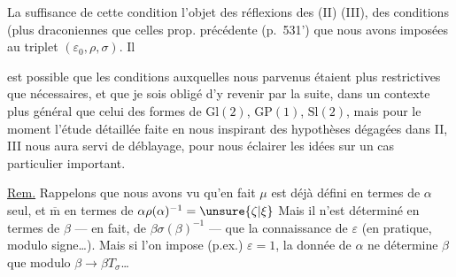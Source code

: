 
La suffisance de cette condition 
l'objet des réflexions des (II) (III),
 des conditions (plus draconiennes que celles
 prop. précédente (p.~531') que nous
avons imposées au triplet $(\varepsilon_0,\rho,\sigma)$. Il



est possible que les conditions auxquelles nous
  parvenus étaient plus restrictives
que nécessaires, et que je sois obligé
d'y revenir par la suite, dans un contexte
plus général que celui des formes de
$\mathrm{Gl}(2)$, $\mathrm{GP}(1)$, $\mathrm{Sl}(2)$, mais pour le moment
l'étude détaillée faite en nous inspirant
des hypothèses dégagées dans  II, III nous
aura servi de déblayage, pour nous éclairer
les idées sur un cas particulier
important.

\uline{Rem.} Rappelons que nous avons vu qu'en
fait $\mu$ est déjà défini en termes de $\alpha$ seul,
et $\overline{\mathrm m}$ en termes de $\alpha\rho(\alpha)^{-1}=\unsure{\zeta|\xi}$ \unsure{;} 
Mais il n'est déterminé en termes de $\beta$
--- en fait, de $\beta\sigma(\beta)^{-1}$ --- que 
la connaissance de $\varepsilon$ (en pratique, modulo
signe\ldots). Mais si l'on impose (p.ex.) $\varepsilon=1$,
la donnée de $\alpha$ ne détermine $\beta$ que
modulo \deleted{$\unsure{\beta}$} $\beta\longrightarrow\beta T_\sigma$\ldots



